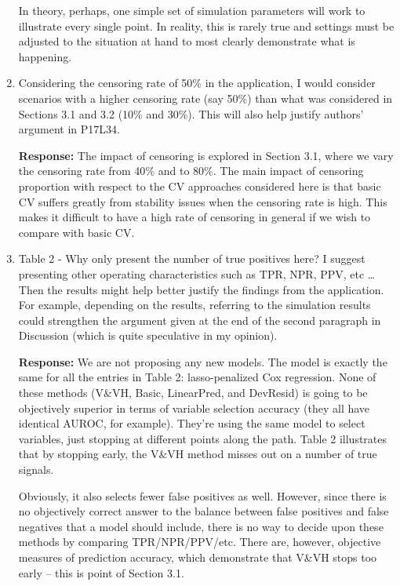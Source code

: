 \documentclass{article}
\newcommand{\re}{\textbf{Response: }}
\begin{document}
\begin{enumerate}[align = left]
  In theory, perhaps, one simple set of simulation parameters will work to illustrate every single point. In reality, this is rarely true and settings must be adjusted to the situation at hand to most clearly demonstrate what is happening.

\item Considering the censoring rate of 50$\%$ in the application, I would consider scenarios with a higher censoring rate (say 50$\%$) than what was considered in Sections 3.1 and 3.2 (10$\%$ and 30$\%$). This will also help justify authors’ argument in P17L34.

  \re The impact of censoring is explored in Section 3.1, where we vary the censoring rate from 40$\%$ and to 80$\%$. The main impact of censoring proportion with respect to the CV approaches considered here is that basic CV suffers greatly from stability issues when the censoring rate is high. This makes it difficult to have a high rate of censoring in general if we wish to compare with basic CV.

\item Table 2 - Why only present the number of true positives here? I suggest presenting other operating characteristics such as TPR, NPR, PPV, etc \ldots Then the results might help better justify the findings from the application. For example, depending on the results, referring to the simulation results could strengthen the argument given at the end of the second paragraph in Discussion (which is quite speculative in my opinion).

  \re We are not proposing any new models. The model is exactly the same for all the entries in Table 2: lasso-penalized Cox regression. None of these methods (V\&VH, Basic, LinearPred, and DevResid) is going to be objectively superior in terms of variable selection accuracy (they all have identical AUROC, for example). They're using the same model to select variables, just stopping at different points along the path. Table 2 illustrates that by stopping early, the V\&VH method misses out on a number of true signals.

  Obviously, it also selects fewer false positives as well. However, since there is no objectively correct answer to the balance between false positives and false negatives that a model should include, there is no way to decide upon these methods by comparing TPR/NPR/PPV/etc. There are, however, objective measures of prediction accuracy, which demonstrate that V\&VH stops too early -- this is point of Section 3.1.


\end{enumerate}
\end{document}

